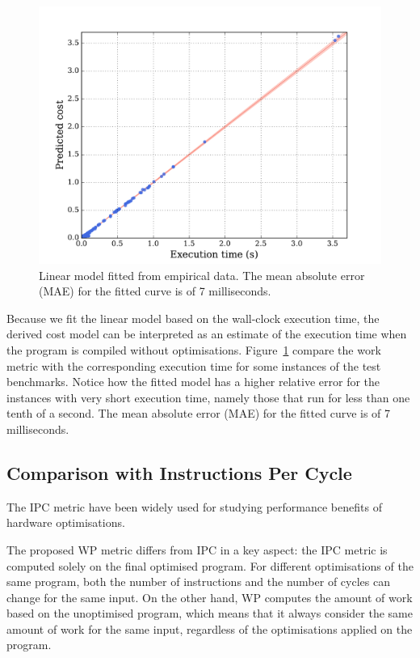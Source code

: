 \begin{figure}[htb]
    \centering
    \includegraphics[width=0.9\linewidth]{figs/cost-model.pdf}
    \caption{Linear model fitted from empirical data. The mean absolute error (MAE) for the fitted curve is of 7 milliseconds.}
    \label{fig:cost-model}
\end{figure}

Because we fit the linear model based on the wall-clock execution time, the derived cost model can be interpreted as an estimate of the execution time when the program is compiled without optimisations.
Figure~\ref{fig:cost-model} compare the work metric with the corresponding execution time for some instances of the test benchmarks.
Notice how the fitted model has a higher relative error for the instances with very short execution time, namely those that run for less than one tenth of a second.
The mean absolute error (MAE) for the fitted curve is of 7 milliseconds.

\subsection{Comparison with Instructions Per Cycle} \label{sec:ipc-vs-work-metric}

The IPC metric have been widely used for studying performance benefits of hardware optimisations.

The proposed WP metric differs from IPC in a key aspect:
the IPC metric is computed solely on the final optimised program.
For different optimisations of the same program, both the number of instructions and the number of cycles can change for the same input.
On the other hand, WP computes the amount of work based on the unoptimised program, which means that it always consider the same amount of work for the same input, regardless of the optimisations applied on the program.

